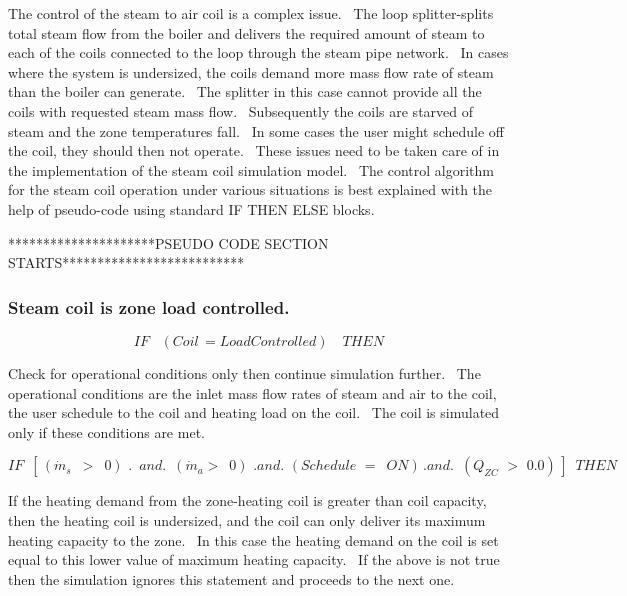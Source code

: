 The control of the steam to air coil is a complex issue.~ The loop splitter-splits total steam flow from the boiler and delivers the required amount of steam to each of the coils connected to the loop through the steam pipe network.~ In cases where the system is undersized, the coils demand more mass flow rate of steam than the boiler can generate.~ The splitter in this case cannot provide all the coils with requested steam mass flow.~ Subsequently the coils are starved of steam and the zone temperatures fall.~ In some cases the user might schedule off the coil, they should then not operate.~ These issues need to be taken care of in the implementation of the steam coil simulation model.~ The control algorithm for the steam coil operation under various situations is best explained with the help of pseudo-code using standard IF THEN ELSE blocks.

*********************PSEUDO CODE SECTION STARTS**************************

\subsubsection{Steam coil is zone load controlled.}\label{steam-coil-is-zone-load-controlled.}

\begin{equation}
IF\,\,\,\,\,(Coil\, = LoadControlled)\,\,\,\,\,\,THEN\,
\end{equation}

Check for operational conditions only then continue simulation further.~ The operational conditions are the inlet mass flow rates of steam and air to the coil, the user schedule to the coil and heating load on the coil.~ The coil is simulated only if these conditions are met.

\begin{equation}
IF\,\,\,\left[ {\,({{\dot m}_s}\,\,\, > \,\,\,0)\,\,.\,\,\,and.\,\,\,({{\dot m}_a} > \,\,\,0)\,\,.and.\,\,(Schedule\,\, = \,\,\,ON)\,.and.\,\,\,({Q_{ZC}}\,\, > \,\,0.0)\,} \right]\,\,\,THEN
\end{equation}

If the heating demand from the zone-heating coil is greater than coil capacity, then the heating coil is undersized, and the coil can only deliver its maximum heating capacity to the zone.~ In this case the heating demand on the coil is set equal to this lower value of maximum heating capacity.~ If the above is not true then the simulation ignores this statement and proceeds to the next one.


